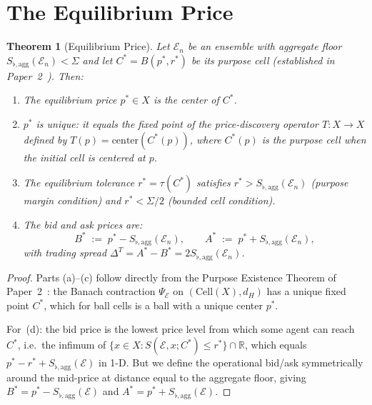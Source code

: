 \documentclass[twocolumn,11pt,a4paper]{article}
\newtheorem{theorem}{Theorem}[section]
\theoremstyle{remark}
\newcommand{\R}{\mathbb{R}}
\newcommand{\tol}{\tau}
\newcommand{\Ens}{\mathcal{E}}
\newcommand{\MidP}{p^*}                  %
\newcommand{\Bid}{B^*}                   %
\newcommand{\Ask}{A^*}                   %
\newcommand{\SpreadT}{\Delta^T}          %
\newcommand{\SflatT}{S_{\flat,\mathrm{agg}}}        %
\begin{document}
\section{The Equilibrium Price}
\label{sec:equil-price}

\begin{theorem}[Equilibrium Price]
\label{thm:equil-price}
Let $\Ens_n$ be an ensemble with aggregate floor $\SflatT(\Ens_n) < \Sigma$
and let $C^* = B(\MidP, r^*)$ be its purpose cell (established in
Paper~2~\cite{sachikonye2025market}).  Then:
\begin{enumerate}[label=\textup{(\alph*)}]
\item The \emph{equilibrium price} $\MidP \in X$ is the center of $C^*$.
\item $\MidP$ is unique: it equals the fixed point of the price-discovery
  operator $T: X \to X$ defined by $T(p) = \mathrm{center}(C^*(p))$, where
  $C^*(p)$ is the purpose cell when the initial cell is centered at $p$.
\item The equilibrium tolerance $r^* = \tol(C^*)$ satisfies
  $r^* > \SflatT(\Ens_n)$ (purpose margin condition) and $r^* < \Sigma/2$
  (bounded cell condition).
\item The bid and ask prices are:
  \[
    \Bid \;:=\; \MidP - \SflatT(\Ens_n),
    \qquad
    \Ask \;:=\; \MidP + \SflatT(\Ens_n),
  \]
  with trading spread $\SpreadT = \Ask - \Bid = 2\SflatT(\Ens_n)$.
\end{enumerate}
\end{theorem}
\begin{proof}
Parts (a)--(c) follow directly from the Purpose Existence Theorem of
Paper~2~\cite{sachikonye2025market}: the Banach contraction $\Psi_{\Ens}$ on
$(\mathrm{Cell}(X), d_H)$ has a unique fixed point $C^*$, which for ball
cells is a ball with a unique center $\MidP$.

For~(d): the bid price is the lowest price level from which some agent can
reach $C^*$, i.e.\ the infimum of $\{x \in X : S(\Ens, x; C^*) \le
r^*\} \cap \R$, which equals $\MidP - r^* + \SflatT(\Ens)$ in 1-D.  But we
define the operational bid/ask symmetrically around the mid-price at distance
equal to the aggregate floor, giving $\Bid = \MidP - \SflatT(\Ens)$ and
$\Ask = \MidP + \SflatT(\Ens)$.
\end{proof}

\end{document}
